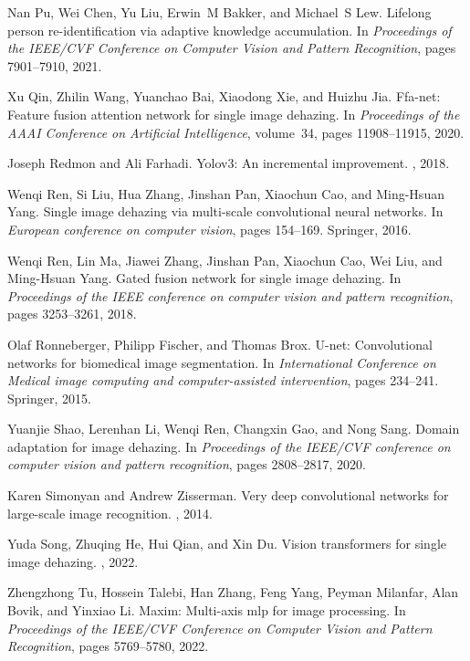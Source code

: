\documentclass[10pt,twocolumn,letterpaper]{article}
\begin{document}
\begin{thebibliography}{10}
Nan Pu, Wei Chen, Yu Liu, Erwin~M Bakker, and Michael~S Lew.
\newblock Lifelong person re-identification via adaptive knowledge
  accumulation.
\newblock In {\em Proceedings of the IEEE/CVF Conference on Computer Vision and
  Pattern Recognition}, pages 7901--7910, 2021.

Xu Qin, Zhilin Wang, Yuanchao Bai, Xiaodong Xie, and Huizhu Jia.
\newblock Ffa-net: Feature fusion attention network for single image dehazing.
\newblock In {\em Proceedings of the AAAI Conference on Artificial
  Intelligence}, volume~34, pages 11908--11915, 2020.

Joseph Redmon and Ali Farhadi.
\newblock Yolov3: An incremental improvement.
, 2018.

Wenqi Ren, Si Liu, Hua Zhang, Jinshan Pan, Xiaochun Cao, and Ming-Hsuan Yang.
\newblock Single image dehazing via multi-scale convolutional neural networks.
\newblock In {\em European conference on computer vision}, pages 154--169.
  Springer, 2016.

Wenqi Ren, Lin Ma, Jiawei Zhang, Jinshan Pan, Xiaochun Cao, Wei Liu, and
  Ming-Hsuan Yang.
\newblock Gated fusion network for single image dehazing.
\newblock In {\em Proceedings of the IEEE conference on computer vision and
  pattern recognition}, pages 3253--3261, 2018.

Olaf Ronneberger, Philipp Fischer, and Thomas Brox.
\newblock U-net: Convolutional networks for biomedical image segmentation.
\newblock In {\em International Conference on Medical image computing and
  computer-assisted intervention}, pages 234--241. Springer, 2015.

Yuanjie Shao, Lerenhan Li, Wenqi Ren, Changxin Gao, and Nong Sang.
\newblock Domain adaptation for image dehazing.
\newblock In {\em Proceedings of the IEEE/CVF conference on computer vision and
  pattern recognition}, pages 2808--2817, 2020.

Karen Simonyan and Andrew Zisserman.
\newblock Very deep convolutional networks for large-scale image recognition.
, 2014.

Yuda Song, Zhuqing He, Hui Qian, and Xin Du.
\newblock Vision transformers for single image dehazing.
, 2022.

Zhengzhong Tu, Hossein Talebi, Han Zhang, Feng Yang, Peyman Milanfar, Alan
  Bovik, and Yinxiao Li.
\newblock Maxim: Multi-axis mlp for image processing.
\newblock In {\em Proceedings of the IEEE/CVF Conference on Computer Vision and
  Pattern Recognition}, pages 5769--5780, 2022.


\end{thebibliography}
\end{document}
